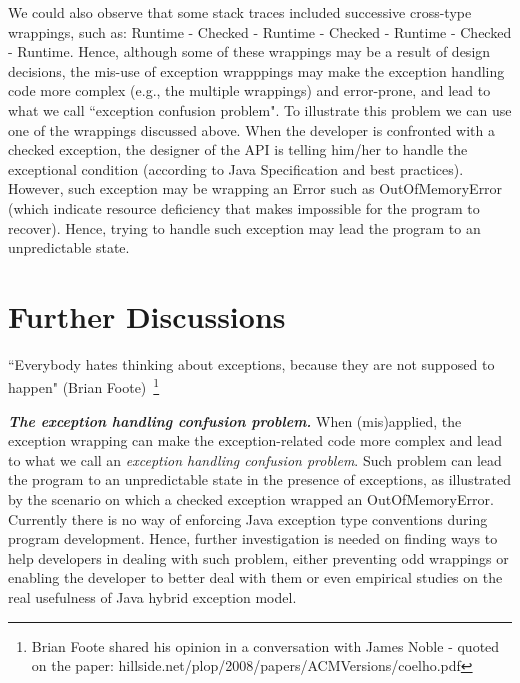 \documentclass[conference]{IEEEtran}
\begin{document}
We could also observe that some stack traces included successive cross-type wrappings, 
such as: Runtime - Checked - Runtime - Checked - Runtime - Checked - Runtime. Hence, although some of these wrappings may be a result of design decisions, the mis-use of exception wrapppings may make the exception handling 
code more complex (e.g., the multiple wrappings) and error-prone,
 and lead to what we call ``exception confusion problem". To illustrate this problem we can use one of the wrappings discussed above.
When the developer is confronted with a checked exception, the designer of the API is telling him/her 
to handle the exceptional condition (according to Java Specification and 
best practices). However, such exception may be wrapping an Error such as OutOfMemoryError (which indicate resource deficiency 
that makes impossible for the program to recover). Hence, trying to handle such exception  
may lead the program to an unpredictable state.

\noindent {}


\section{Further Discussions}
\label{sec:disc}


 ``Everybody hates thinking about exceptions, because they are not supposed to happen"
  (Brian Foote)~\footnote{Brian Foote shared his opinion in a conversation with James Noble - quoted on the paper: hillside.net/plop/2008/papers/ACMVersions/coelho.pdf}


\emph{\textbf{The exception handling confusion problem.}}
When (mis)applied, the exception wrapping can make the exception-related code
 more complex and lead to what we call an \emph{exception handling confusion problem}.
Such problem can lead the program to an unpredictable state in the presence of exceptions,
as illustrated by the scenario on which a checked exception wrapped an OutOfMemoryError. 
Currently there is no way of enforcing Java exception type conventions during program development.
Hence, further investigation is needed on finding ways to help developers in dealing with such
 problem, either preventing odd wrappings or enabling the developer to better deal with them or even
empirical studies on the real usefulness of Java hybrid exception model. 
\end{document}
